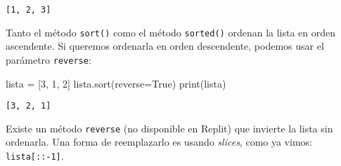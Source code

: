 \documentclass[
  letterpaper,
  DIV=11,
  numbers=noendperiod]{scrreprt}
\newenvironment{Shaded}{\begin{snugshade}}{\end{snugshade}}
\newcommand{\BuiltInTok}[1]{\textcolor[rgb]{0.00,0.23,0.31}{#1}}
\newcommand{\DecValTok}[1]{\textcolor[rgb]{0.68,0.00,0.00}{#1}}
\newcommand{\NormalTok}[1]{\textcolor[rgb]{0.00,0.23,0.31}{#1}}
\newcommand{\OperatorTok}[1]{\textcolor[rgb]{0.37,0.37,0.37}{#1}}
\newcommand{\VariableTok}[1]{\textcolor[rgb]{0.07,0.07,0.07}{#1}}
\begin{document}
\begin{verbatim}
[1, 2, 3]
\end{verbatim}

Tanto el método \texttt{sort()} como el método \texttt{sorted()} ordenan
la lista en orden ascendente. Si queremos ordenarla en orden
descendente, podemos usar el parámetro \texttt{reverse}:

\begin{Shaded}
\begin{Highlighting}[]
\NormalTok{lista }\OperatorTok{=}\NormalTok{ [}\DecValTok{3}\NormalTok{, }\DecValTok{1}\NormalTok{, }\DecValTok{2}\NormalTok{]}
\NormalTok{lista.sort(reverse}\OperatorTok{=}\VariableTok{True}\NormalTok{)}
\BuiltInTok{print}\NormalTok{(lista)}
\end{Highlighting}
\end{Shaded}

\begin{verbatim}
[3, 2, 1]
\end{verbatim}

Existe un método \texttt{reverse} (no disponible en Replit) que invierte
la lista sin ordenarla. Una forma de reemplazarlo es usando
\emph{slices}, como ya vimos: \texttt{lista{[}::-1{]}}.
\end{document}
